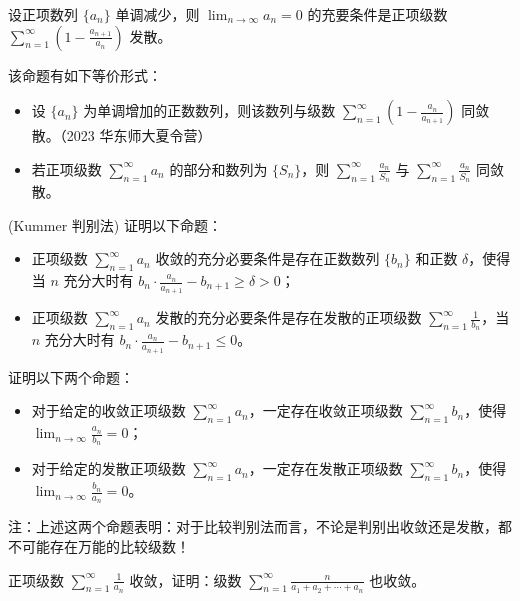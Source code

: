 \documentclass[lang=cn,10pt,thmcnt=section]{elegantbook}
\begin{document}
	\begin{example}
	设正项数列 $\{a_n\}$ 单调减少，则 $\lim_{n \to \infty} a_n = 0$ 的充要条件是正项级数 $\sum_{n=1}^{\infty} \left(1 - \frac{a_{n+1}}{a_n}\right)$ 发散。
	\end{example}
	
	该命题有如下等价形式：
	
	\begin{itemize}
		\item 设 $\{a_n\}$ 为单调增加的正数数列，则该数列与级数 $\sum_{n=1}^{\infty} \left(1 - \frac{a_n}{a_{n+1}}\right)$ 同敛散。（2023 华东师大夏令营）
		\item 若正项级数 $\sum_{n=1}^{\infty} a_n$ 的部分和数列为 $\{S_n\}$，则 $\sum_{n=1}^{\infty} \frac{a_n}{S_n}$ 与 $\sum_{n=1}^{\infty} \frac{a_n}{S_n}$ 同敛散。
	\end{itemize}
	
	\begin{example}
	(Kummer 判别法) 证明以下命题：
	\begin{itemize}
		\item 正项级数 $\sum_{n=1}^{\infty} a_n$ 收敛的充分必要条件是存在正数数列 $\{b_n\}$ 和正数 $\delta$，使得当 $n$ 充分大时有 $b_n \cdot \frac{a_n}{a_{n+1}} - b_{n+1} \geq \delta > 0$；
		\item 正项级数 $\sum_{n=1}^{\infty} a_n$ 发散的充分必要条件是存在发散的正项级数 $\sum_{n=1}^{\infty} \frac{1}{b_n}$，当 $n$ 充分大时有 $b_n \cdot \frac{a_n}{a_{n+1}} - b_{n+1} \leq 0$。
	\end{itemize}
	\end{example}
	
	\begin{example}
	证明以下两个命题：
	\begin{itemize}
		\item 对于给定的收敛正项级数 $\sum_{n=1}^{\infty} a_n$，一定存在收敛正项级数 $\sum_{n=1}^{\infty} b_n$，使得 $\lim_{n \to \infty} \frac{a_n}{b_n} = 0$；
		\item 对于给定的发散正项级数 $\sum_{n=1}^{\infty} a_n$，一定存在发散正项级数 $\sum_{n=1}^{\infty} b_n$，使得 $\lim_{n \to \infty} \frac{b_n}{a_n} = 0$。
	\end{itemize}
	\end{example}
	
	注：上述这两个命题表明：对于比较判别法而言，不论是判别出收敛还是发散，都不可能存在万能的比较级数！
	
	\begin{example}
	正项级数 $\sum_{n=1}^{\infty} \frac{1}{a_n}$ 收敛，证明：级数 $\sum_{n=1}^{\infty} \frac{n}{a_1 + a_2 + \cdots + a_n}$ 也收敛。
	\end{example}
	
\end{document}
